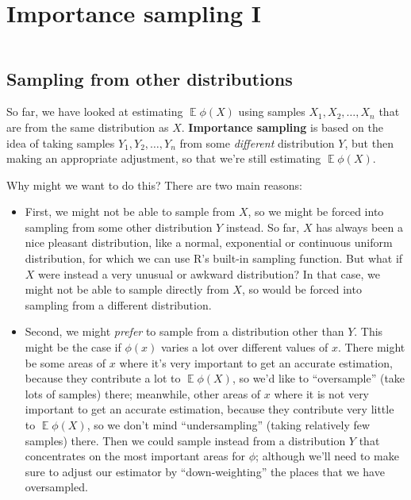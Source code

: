 \documentclass[
  letterpaper,
  DIV=11,
  numbers=noendperiod]{scrreprt}
\newcommand{\Exg}{\operatorname{\mathbb{E}}}
\theoremstyle{plain}
\theoremstyle{definition}
\theoremstyle{definition}
\theoremstyle{remark}
\begin{document}
\chapter{Importance sampling I}\label{importance-sampling-i}

\[ \]

\section{Sampling from other
distributions}\label{sampling-from-other-distributions}

So far, we have looked at estimating \(\Exg \phi(X)\) using samples
\(X_1, X_2, \dots, X_n\) that are from the same distribution as \(X\).
\textbf{Importance sampling} is based on the idea of taking samples
\(Y_1, Y_2, \dots, Y_n\) from some \emph{different} distribution \(Y\),
but then making an appropriate adjustment, so that we're still
estimating \(\Exg \phi(X)\).

Why might we want to do this? There are two main reasons:

\begin{itemize}
\item
  First, we might not be able to sample from \(X\), so we might be
  forced into sampling from some other distribution \(Y\) instead. So
  far, \(X\) has always been a nice pleasant distribution, like a
  normal, exponential or continuous uniform distribution, for which we
  can use R's built-in sampling function. But what if \(X\) were instead
  a very unusual or awkward distribution? In that case, we might not be
  able to sample directly from \(X\), so would be forced into sampling
  from a different distribution.
\item
  Second, we might \emph{prefer} to sample from a distribution other
  than \(Y\). This might be the case if \(\phi(x)\) varies a lot over
  different values of \(x\). There might be some areas of \(x\) where
  it's very important to get an accurate estimation, because they
  contribute a lot to \(\Exg\phi(X)\), so we'd like to ``oversample''
  (take lots of samples) there; meanwhile, other areas of \(x\) where it
  is not very important to get an accurate estimation, because they
  contribute very little to \(\Exg\phi(X)\), so we don't mind
  ``undersampling'' (taking relatively few samples) there. Then we could
  sample instead from a distribution \(Y\) that concentrates on the most
  important areas for \(\phi\); although we'll need to make sure to
  adjust our estimator by ``down-weighting'' the places that we have
  oversampled.
\end{itemize}
\end{document}
